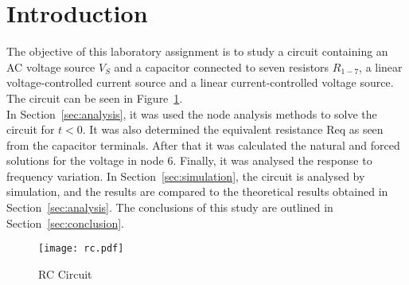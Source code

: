 \section{Introduction}
\label{sec:introduction}

\par The objective of this laboratory assignment is to study a circuit containing an
AC voltage source $V_S$ and a capacitor connected to seven resistors $R_{1-7}$, a linear voltage-controlled current source and a  linear current-controlled voltage source. The circuit can be seen in Figure~\ref{fig:rc}.\\



In Section~\ref{sec:analysis}, it was used the node analysis methods to solve the circuit for $t<0$. It was also determined the equivalent resistance Req as seen from the capacitor terminals. After that it was calculated the natural and forced solutions for the voltage in node 6. Finally, it was analysed the response to frequency variation.
In Section~\ref{sec:simulation}, the circuit is analysed by
simulation, and the results are compared to the theoretical results obtained in
Section~\ref{sec:analysis}. The conclusions of this study are outlined in
Section~\ref{sec:conclusion}.

\begin{figure}[h] \centering
\texttt{[image: rc.pdf]}
\caption{RC Circuit}
\label{fig:rc}
\end{figure}
